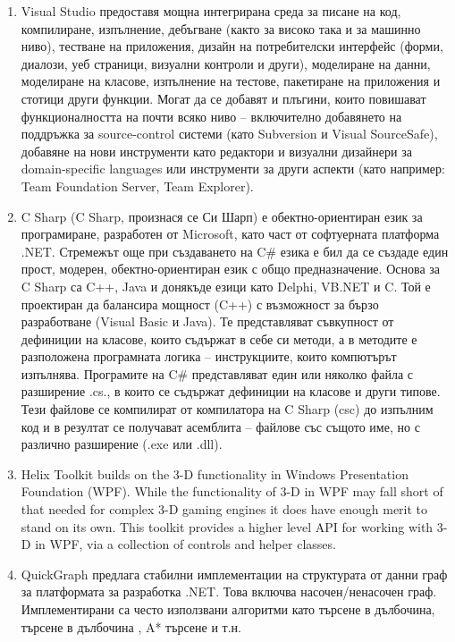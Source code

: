 \begin{enumerate}
    \item Visual Studio предоставя мощна интегрирана среда за писане на код, компилиране, изпълнение, дебъгване (както за високо така и за машинно ниво), тестване на приложения, дизайн на потребителски интерфейс (форми, диалози, уеб страници, визуални контроли и други), моделиране на данни, моделиране на класове, изпълнение на тестове, пакетиране на приложения и стотици други функции. Могат да се добавят и плъгини, които повишават функционалността на почти всяко ниво – включително добавянето на поддръжка за source-control системи (като Subversion и Visual SourceSafe), добавяне на нови инструменти като редактори и визуални дизайнери за domain-specific languages или инструменти за други аспекти (като например: Team Foundation Server, Team Explorer). \cite{vs}
    
    \item C Sharp (C Sharp, произнася се Си Шарп) е обектно-ориентиран език за програмиране, разработен от Microsoft, като част от софтуерната платформа .NET. Стремежът още при създаването на C# езика е бил да се създаде един прост, модерен, обектно-ориентиран език с общо предназначение. Основа за C Sharp са C++, Java и донякъде езици като Delphi, VB.NET и C. Той е проектиран да балансира мощност (C++) с възможност за бързо разработване (Visual Basic и Java). Те представляват съвкупност от дефиниции на класове, които съдържат в себе си методи, а в методите е разположена програмната логика – инструкциите, които компютърът изпълнява. Програмите на C# представляват един или няколко файла с разширение .cs., в които се съдържат дефиниции на класове и други типове. Тези файлове се компилират от компилатора на C Sharp (csc) до изпълним код и в резултат се получават асемблита – файлове със същото име, но с различно разширение (.exe или .dll). \cite{csharp}
    
    \item Helix Toolkit builds on the 3-D functionality in Windows Presentation Foundation (WPF). While the functionality of 3-D in WPF may fall short of that needed for complex 3-D gaming engines it does have enough merit to stand on its own. This toolkit provides a higher level API for working with 3-D in WPF, via a collection of controls and helper classes. \cite{helix}
    
    \item QuickGraph предлага стабилни имплементации на структурата от данни граф за платформата за разработка .NET. Това включва насочен/ненасочен граф. Имплементирани са често използвани алгоритми като търсене в дълбочина, търсене в дълбочина , A* търсене и т.н. \cite{quickgraph}

    
\end{enumerate}